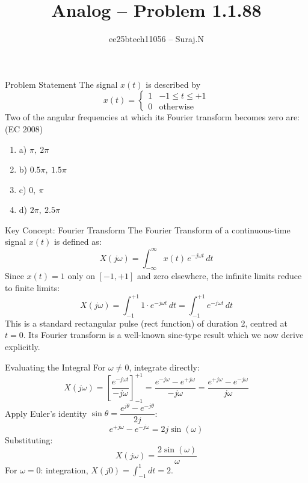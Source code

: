 \documentclass{beamer}
\title{Analog -- Problem 1.1.88}
\author{ee25btech11056 -- Suraj.N}
\begin{document}
\begin{frame}
  \titlepage
\end{frame}

\begin{frame}{Problem Statement}
The signal $x(t)$ is described by
\[
  x(t) = \begin{cases} 1 & -1 \leq t \leq +1 \\ 0 & \text{otherwise} \end{cases}
\]
Two of the angular frequencies at which its Fourier transform becomes
zero are: \hfill (EC 2008)

\begin{enumerate}
\item a) $\pi,\ 2\pi$
\item b) $0.5\pi,\ 1.5\pi$
\item c) $0,\ \pi$
\item d) $2\pi,\ 2.5\pi$
\end{enumerate}
\end{frame}

\begin{frame}{Key Concept: Fourier Transform}
The Fourier Transform of a continuous-time signal $x(t)$ is defined as:
\[
  X(j\omega) = \int_{-\infty}^{\infty} x(t)\, e^{-j\omega t}\, dt
\]
Since $x(t) = 1$ only on $[-1,+1]$ and zero elsewhere, the infinite
limits reduce to finite limits:
\[
  X(j\omega) = \int_{-1}^{+1} 1 \cdot e^{-j\omega t}\, dt
  = \int_{-1}^{+1} e^{-j\omega t}\, dt
\]
This is a standard rectangular pulse (rect function) of duration 2,
centred at $t = 0$. Its Fourier transform is a well-known sinc-type
result which we now derive explicitly.
\end{frame}

\begin{frame}{Evaluating the Integral}
For $\omega \neq 0$, integrate directly:
\[
  X(j\omega)
  = \left[\frac{e^{-j\omega t}}{-j\omega}\right]_{-1}^{+1}
  = \frac{e^{-j\omega} - e^{+j\omega}}{-j\omega}
  = \frac{e^{+j\omega} - e^{-j\omega}}{j\omega}
\]
Apply Euler's identity $\sin\theta = \dfrac{e^{j\theta}-e^{-j\theta}}{2j}$:
\[
  e^{+j\omega} - e^{-j\omega} = 2j\sin(\omega)
\]
Substituting:
\[
  \boxed{X(j\omega) = \frac{2\sin(\omega)}{\omega}}
\]
For $\omega = 0$:  integration,
$X(j0) = \displaystyle\int_{-1}^{1} dt = 2$.
\end{frame}
\end{document}
